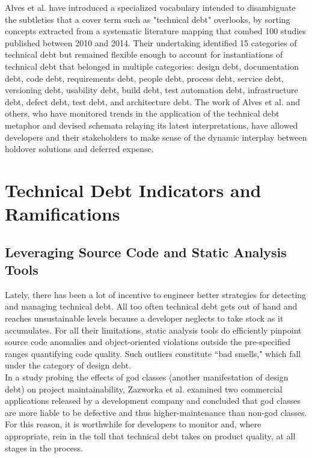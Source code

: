 Alves et al.\cite{alves2014towards} have introduced a specialized vocabulary intended to disambiguate the subtleties that a cover term such as "technical debt" overlooks, by sorting concepts extracted from a systematic literature mapping that combed 100 studies published between 2010 and 2014. Their undertaking identified 15 categories of technical debt but remained flexible enough to account for instantiations of technical debt that belonged in multiple categories: design debt, documentation debt, code debt, requirements debt, people debt, process debt, service debt, versioning debt, usability debt, build debt, test automation debt, infrastructure debt, defect debt, test debt, and architecture debt. The work of Alves et al. and others, who have monitored trends in the application of the technical debt metaphor and devised schemata relaying its latest interpretations, have allowed developers and their stakeholders to make sense of the dynamic interplay between holdover solutions and deferred expense.

\section{Technical Debt Indicators and Ramifications}


\subsection{Leveraging Source Code and Static Analysis Tools}

Lately, there has been a lot of incentive to engineer better strategies for detecting and managing technical debt. All too often technical debt gets out of hand and reaches unsustainable levels because a developer neglects to take stock as it accumulates. For all their limitations, static analysis tools do efficiently pinpoint source code anomalies and object-oriented violations outside the pre-specified ranges quantifying code quality. Such outliers constitute ``bad smells," which fall under the category of design debt.\\

In a study probing the effects of god classes (another manifestation of design debt) on project maintainability, Zazworka et al. \cite{zazworka2011investigating} examined two commercial applications released by a development company and concluded that god classes are more liable to be defective and thus higher-maintenance than non-god classes. For this reason, it is worthwhile for developers to monitor and, where appropriate, rein in the toll that technical debt takes on product quality, at all stages in the process.\\

